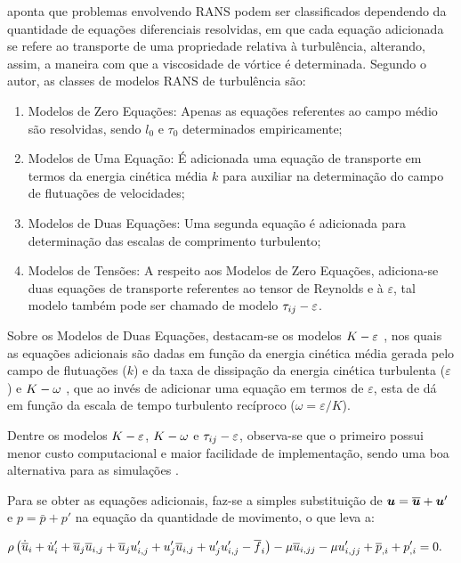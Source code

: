  aponta que problemas envolvendo RANS podem ser classificados dependendo da quantidade de equações diferenciais resolvidas, em que cada equação adicionada se refere ao transporte de uma propriedade relativa à turbulência, alterando, assim, a maneira com que a viscosidade de vórtice é determinada. Segundo o autor, as classes de modelos RANS de turbulência são:

\begin{enumerate}[label=\alph*.]
    \item Modelos de Zero Equações: Apenas as equações referentes ao campo médio são resolvidas, sendo $l_0$ e $\tau_0$ determinados empiricamente;
    \item Modelos de Uma Equação: É adicionada uma equação de transporte em termos da energia cinética média $k$ para auxiliar na determinação do campo de flutuações de velocidades;
    \item Modelos de Duas Equações: Uma segunda equação é adicionada para determinação das escalas de comprimento turbulento;
    \item Modelos de Tensões: A respeito aos Modelos de Zero Equações, adiciona-se duas equações de transporte referentes ao tensor de Reynolds e à $\varepsilon$, tal modelo também pode ser chamado de modelo $\tau_{ij}-\varepsilon$.
\end{enumerate}

Sobre os Modelos de Duas Equações, destacam-se os modelos $K-\varepsilon$ \cite{haakansson2012experimental,davidson2014pans,parente2011improved}, nos quais as equações adicionais são dadas em função da energia cinética média gerada pelo campo de flutuações ($k$) e da taxa de dissipação da energia cinética turbulenta ($\varepsilon$) e $K-\omega$ \cite{larsen2018over,bassi2005discontinuous}, que ao invés de adicionar uma equação em termos de $\varepsilon$, esta de dá em função da escala de tempo turbulento recíproco ($\omega=\varepsilon/K$).

Dentre os modelos $K-\varepsilon$, $K-\omega$ e $\tau_{ij}-\varepsilon$, observa-se que o primeiro possui menor custo computacional e maior facilidade de implementação, sendo uma boa alternativa para as simulações \cite{koutsourakis2012evaluation,adanta2020comparison}.

Para se obter as equações adicionais, faz-se a simples substituição de $\boldsymbol{u}=\overline{\boldsymbol{u}}+\boldsymbol{u}'$ e $p=\bar{p}+p'$ na equação da quantidade de movimento, o que leva a:

\begin{equation}
    \begin{split}
        &\rho\left({\dot{\overline{u}}_i+\dot{u}'_i+\overline{u}_j\overline{u}_{i,j}+\overline{u}_ju'_{i,j}+u'_j\overline{u}_{i,j}+u'_ju'_{i,j}-\overline{f}_i}\right)-\mu\overline{u}_{i,jj}-\mu u'_{i,jj}+\overline{p}_{,i}+p'_{,i}=0\text{.}
    \end{split}
    \label{eq:NS-RANS1}
\end{equation}

